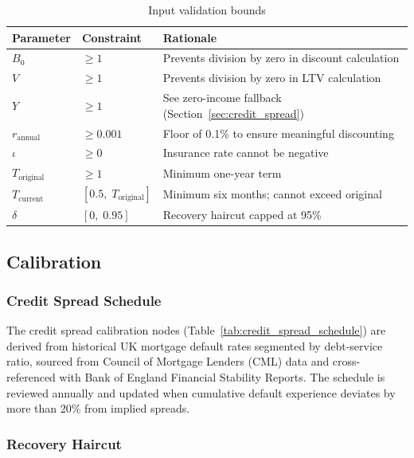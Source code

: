 \documentclass[11pt,a4paper]{article}
\begin{document}
\begin{table}[H]
    \centering
    \caption{Input validation bounds}
    \label{tab:validation}
    \begin{tabular}{@{}lll@{}}
        \toprule
        \textbf{Parameter} & \textbf{Constraint} & \textbf{Rationale} \\
        \midrule
        $B_0$                 & $\geq 1$          & Prevents division by zero in discount calculation \\
        $V$                   & $\geq 1$          & Prevents division by zero in LTV calculation \\
        $Y$                   & $\geq 1$          & See zero-income fallback (Section~\ref{sec:credit_spread}) \\
        $r_{\text{annual}}$   & $\geq 0.001$      & Floor of 0.1\% to ensure meaningful discounting \\
        $\iota$               & $\geq 0$          & Insurance rate cannot be negative \\
        $T_{\text{original}}$ & $\geq 1$          & Minimum one-year term \\
        $T_{\text{current}}$  & $[0.5,\; T_{\text{original}}]$ & Minimum six months; cannot exceed original \\
        $\delta$              & $[0,\; 0.95]$     & Recovery haircut capped at 95\% \\
        \bottomrule
    \end{tabular}
\end{table}

\subsection{Calibration}

\subsubsection{Credit Spread Schedule}

The credit spread calibration nodes (Table~\ref{tab:credit_spread_schedule}) are derived
from historical UK mortgage default rates segmented by debt-service ratio, sourced from
Council of Mortgage Lenders (CML) data and cross-referenced with Bank of England
Financial Stability Reports. The schedule is reviewed annually and updated when
cumulative default experience deviates by more than 20\% from implied spreads.

\subsubsection{Recovery Haircut}
\end{document}
